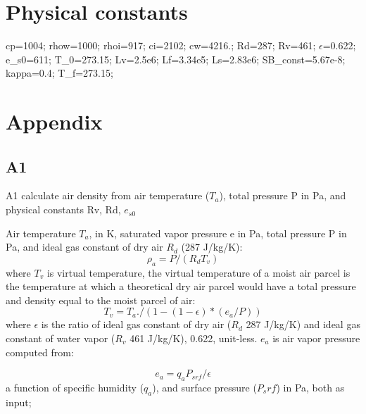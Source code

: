 \documentclass{article}
\begin{document}
\section{Physical constants}
cp=1004;        %
rhow=1000;      %
rhoi=917;       %
ci=2102;        %
cw=4216.;       %
Rd=287;         %
Rv=461;         %
$\epsilon$=0.622;  %
e_s0=611;       %
T_0=273.15;     %
Lv=2.5e6;       %
Lf=3.34e5;      %
Ls=2.83e6;      %
SB_const=5.67e-8;  %
kappa=0.4;          %
T_f=273.15;     %

\section{Appendix}
\subsection{A1}
A1 calculate air density from air temperature ($T_a$), total pressure P in Pa, and physical constants Rv, Rd, $e_{s0}$

Air temperature $T_a$, in K, saturated vapor pressure e in Pa, total pressure P in Pa, and ideal gas constant of dry air $R_d$ (287 J/kg/K):
\begin{equation}
\rho_a=P/(R_d T_v)
\end{equation}where $T_v$ is virtual temperature, the virtual temperature of a moist air parcel is the temperature at which a theoretical dry air parcel would have a total pressure and density equal to the moist parcel of air:
\begin{equation}
T_v=T_a./(1-(1-\epsilon)*(e_a/P))
\end{equation}
where $\epsilon$ is the ratio of ideal gas constant of dry air ($R_d$ 287 J/kg/K) and ideal gas constant of water vapor ($R_v$ 461 J/kg/K), 0.622, unit-less. $e_a$ is air vapor pressure computed from:

\begin{equation}
e_a = q_aP_{srf}/\epsilon
\end{equation}
a function of specific humidity ($q_a$), and surface pressure ($P_srf$) in Pa, both as input; 
\end{document}
